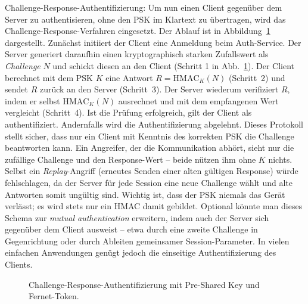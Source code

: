 Challenge-Response-Authentifizierung: Um nun einen Client gegenüber dem Server zu authentisieren, ohne den PSK im Klartext zu übertragen, wird das Challenge-Response-Verfahren eingesetzt. Der Ablauf ist in Abbildung \ref{fig:auth-flow} dargestellt. Zunächst initiiert der Client eine Anmeldung beim Auth-Service. Der Server generiert daraufhin einen kryptographisch starken Zufallswert als \textit{Challenge} $N$ und schickt diesen an den Client (Schritt 1 in Abb.~\ref{fig:auth-flow}). Der Client berechnet mit dem PSK $K$ eine Antwort $R = \mathrm{HMAC}_K(N)$ (Schritt 2) und sendet $R$ zurück an den Server (Schritt 3). Der Server wiederum verifiziert $R$, indem er selbst $\mathrm{HMAC}_K(N)$ ausrechnet und mit dem empfangenen Wert vergleicht (Schritt 4). Ist die Prüfung erfolgreich, gilt der Client als authentifiziert. Andernfalls wird die Authentifizierung abgelehnt. Dieses Protokoll stellt sicher, dass nur ein Client mit Kenntnis des korrekten PSK die Challenge beantworten kann. Ein Angreifer, der die Kommunikation abhört, sieht nur die zufällige Challenge und den Response-Wert – beide nützen ihm ohne $K$ nichts. Selbst ein \textit{Replay}-Angriff (erneutes Senden einer alten gültigen Response) würde fehlschlagen, da der Server für jede Session eine neue Challenge wählt und alte Antworten somit ungültig sind. Wichtig ist, dass der PSK niemals das Gerät verlässt; es wird stets nur ein HMAC damit gebildet. Optional könnte man dieses Schema zur \textit{mutual authentication} erweitern, indem auch der Server sich gegenüber dem Client ausweist – etwa durch eine zweite Challenge in Gegenrichtung oder durch Ableiten gemeinsamer Session-Parameter. In vielen einfachen Anwendungen genügt jedoch die einseitige Authentifizierung des Clients.

\begin{figure}[h]
\centering
{}
\caption{Challenge-Response-Authentifizierung mit Pre-Shared Key und Fernet-Token.}
\label{fig:auth-flow}
\end{figure}

